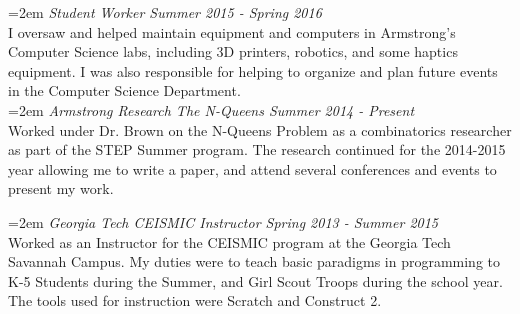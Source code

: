 \documentclass[11pt]{article} %
\begin{document}
\hangindent=2em
\emph{Student Worker Summer 2015 - Spring 2016}\\
I oversaw and helped maintain equipment and computers in Armstrong's Computer Science labs, including 3D printers, robotics, and some haptics equipment. I was also responsible for helping to organize and plan future events in the Computer Science Department. \\

\hangindent=2em
\emph{Armstrong Research The N-Queens Summer 2014 - Present}\\
Worked under Dr. Brown on the N-Queens Problem as a combinatorics researcher as part of the STEP Summer program. The research continued for the 2014-2015 year allowing me to write a paper, and attend several conferences and events to present my work.

\hangindent=2em
\emph{Georgia Tech CEISMIC Instructor Spring 2013 - Summer 2015}\\
Worked as an Instructor for the CEISMIC program at the Georgia Tech Savannah Campus. My duties were to teach basic paradigms in programming to K-5 Students during the Summer, and Girl Scout Troops during the school year. The tools used for instruction were Scratch and Construct 2.
\end{document}
